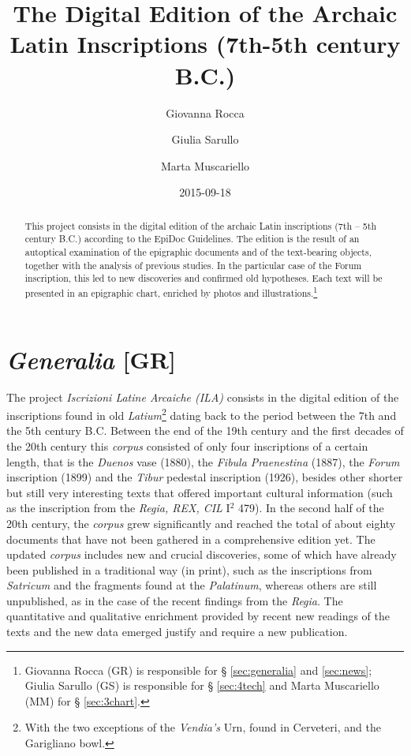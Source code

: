 \documentclass[amsthm,ebook]{saparticle}
\title{The Digital Edition of the Archaic Latin Inscriptions (7th{}-5th century B.C.)}
\author[unimi]{Giovanna Rocca }
\author[kore]{Giulia Sarullo \corref{first}}
\author[unimi]{Marta Muscariello}
\date{2015-09-18}
\begin{document}
\maketitle
\begin{abstract}
This project consists in the digital edition of the archaic Latin inscriptions (7th – 5th century B.C.) according to the
EpiDoc Guidelines. The edition is the result of an autoptical examination of the epigraphic documents and of the
text-bearing objects, together with the analysis of previous studies. In the particular case of the Forum inscription,
this led to new discoveries and confirmed old hypotheses. Each text will be presented in an epigraphic chart, enriched
by photos and illustrations.\footnote{Giovanna Rocca (GR) is responsible for § \ref{sec:generalia} and \ref{sec:news};
Giulia Sarullo (GS) is responsible for § \ref{sec:4tech} and Marta Muscariello (MM) for § \ref{sec:3chart}.}
\end{abstract}







\section{\emph{Generalia} [GR]}\label{sec:generalia}


\noindent The project \emph{Iscrizioni Latine Arcaiche (ILA)} consists in the digital edition of the inscriptions found in old
\emph{Latium}\footnote{With the two exceptions of the \emph{Vendia's} Urn, found in Cerveteri, and the Garigliano bowl.}
dating back to the period between the 7th and the 5th century B.C. Between the end of the 19th century and the first
decades of the 20th century this \emph{corpus} consisted of only four inscriptions of a certain length, that is the \emph{Duenos}
vase (1880), the \emph{Fibula Praenestina} (1887), the \emph{Forum} inscription (1899) and the \emph{Tibur} pedestal inscription (1926),
besides other shorter but still very interesting texts that offered important cultural information (such as the
inscription from the \emph{Regia, REX, CIL} I$^2$ 479). In the second half of the 20th century, the \emph{corpus} grew significantly and
reached the total of about eighty documents that have not been gathered in a comprehensive edition yet. The updated
\emph{corpus} includes new and crucial discoveries, some of which have already been published in a traditional way (in print),
such as the inscriptions from \emph{Satricum} and the fragments found at the \emph{Palatinum}, whereas others are still unpublished,
as in the case of the recent findings from the \emph{Regia}. The quantitative and qualitative enrichment provided by recent
new readings of the texts and the new data emerged justify and require a new publication. 
\end{document}
